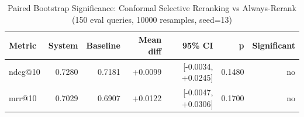\begin{table}[H]
\centering
\caption{Paired Bootstrap Significance: Conformal Selective Reranking vs Always-Rerank (150 eval queries, 10000 resamples, seed=13)}
\label{tab:val_significance}
\begin{tabular}{lrrrrrr}
\toprule
Metric & System & Baseline & Mean diff & 95\% CI & p & Significant \\
\midrule
ndcg@10 & 0.7280 & 0.7181 & +0.0099 & [-0.0034, +0.0245] & 0.1480 & no \\
mrr@10 & 0.7029 & 0.6907 & +0.0122 & [-0.0047, +0.0306] & 0.1700 & no \\
\bottomrule
\end{tabular}
\end{table}